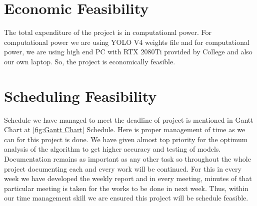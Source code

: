        \section{Economic Feasibility}
           The total expenditure of the project is in computational power. For computational power we are using YOLO V4 weights file and for computational power, we are using high end PC with RTX 2080Ti provided by College and also our own laptop. So, the project is economically feasible.

        \section{Scheduling Feasibility}
            Schedule we have managed to meet the deadline of project is mentioned in Gantt Chart at \ref*{fig:Gantt Chart} Schedule. Here is proper management of time as we can for this project is done. We have given almost top priority for the optimum analysis of the algorithm to get higher accuracy and testing of models. Documentation remains as important as any other task so throughout the whole project documenting each and every work will be continued. For this in every week we have developed the weekly report and in every meeting, minutes of that particular meeting is taken for the works to be done in next week.
            Thus, within our time management skill we are ensured this project will be schedule feasible.


